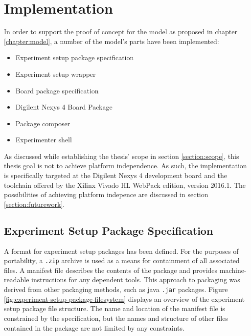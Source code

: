 \documentclass[main.tex]{subfiles}
\begin{document}
\chapter{Implementation}
In order to support the proof of concept for the model as proposed in chapter \ref{chapter:model}, a number of the model's parts have been implemented:
\begin{itemize}
    \item Experiment setup package specification
    \item Experiment setup wrapper
    \item Board package specification
    \item Digilent Nexys 4 Board Package
    \item Package composer
    \item Experimenter shell
\end{itemize}

As discussed while establishing the thesis' scope in section \ref{section:scope}, this thesis goal is not to achieve platform independence. As such, the implementation is specifically targeted at the Digilent Nexys 4 development board and the toolchain offered by the Xilinx Vivado HL WebPack edition, version 2016.1. The possibilities of achieving platform indepence are discussed in section \ref{section:futurework}.

\section{Experiment Setup Package Specification}
\label{section:experiment-setup-package-specification}
A format for experiment setup packages has been defined. For the purposes of portability, a \texttt{.zip} archive is used as a means for containment of all associated files. A manifest file describes the contents of the package and provides machine-readable instructions for any dependent tools. This approach to packaging was derived from other packaging methods, such as java \texttt{.jar} packages. Figure \ref{fig:experiment-setup-package-filesystem} displays an overview of the experiment setup package file structure. The name and location of the manifest file is constrained by the specification, but the names and structure of other files contained in the package are not limited by any constraints.

\begin{figure}[h]
\centering
\caption{An overview of the experiment setup package file structure}
\label{fig:experiment-setup-package-filesystem}
\begin{subfigure}[b]{0.4\textwidth}
\end{subfigure}
\end{figure}
\end{document}
